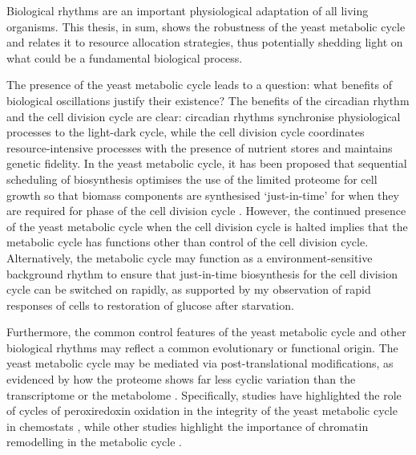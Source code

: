 Biological rhythms are an important physiological adaptation of all living organisms.
This thesis, in sum, shows the robustness of the yeast metabolic cycle and relates it to resource allocation strategies, thus potentially shedding light on what could be a fundamental biological process.

The presence of the yeast metabolic cycle leads to a question: what benefits of biological oscillations justify their existence?
The benefits of the circadian rhythm and the cell division cycle are clear: circadian rhythms synchronise physiological processes to the light-dark cycle, while the cell division cycle coordinates resource-intensive processes with the presence of nutrient stores and maintains genetic fidelity.
In the yeast metabolic cycle, it has been proposed that sequential scheduling of biosynthesis optimises the use of the limited proteome for cell growth \parencite{oneillEukaryoticCellBiology2020,takhaveevTemporalSegregationBiosynthetic2023} so that biomass components are synthesised `just-in-time' for when they are required for phase of the cell division cycle \parencite{zylstraMetabolicDynamicsCell2022}.
However, the continued presence of the yeast metabolic cycle when the cell division cycle is halted implies that the metabolic cycle has functions other than control of the cell division cycle.
Alternatively, the metabolic cycle may function as a environment-sensitive background rhythm to ensure that just-in-time biosynthesis for the cell division cycle can be switched on rapidly, as supported by my observation of rapid responses of cells to restoration of glucose after starvation.

Furthermore, the common control features of the yeast metabolic cycle and other biological rhythms may reflect a common evolutionary or functional origin.
The yeast metabolic cycle may be mediated via post-translational modifications, as evidenced by how the proteome shows far less cyclic variation than the transcriptome \parencite{felthamTranscriptionalChangesAre2020} or the metabolome \parencite{oneillEukaryoticCellBiology2020}.
Specifically, studies have highlighted the role of cycles of peroxiredoxin oxidation in the integrity of the yeast metabolic cycle in chemostats \parencite{caustonMetabolicCyclesYeast2015,amponsahPeroxiredoxinsCoupleMetabolism2021}, while other studies highlight the importance of chromatin remodelling in the metabolic cycle \parencite{nocettiNucleosomeRepositioningUnderlies2016,gowansINO80ChromatinRemodeling2018}.

